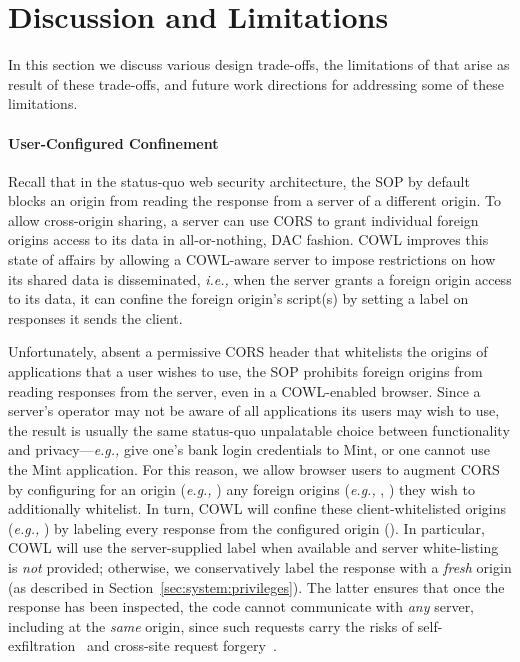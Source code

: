 \section{Discussion and Limitations}
\label{sec:discussion}

In this section we discuss various design trade-offs, the limitations
of \sys{} that arise as result of these trade-offs, and future work
directions for addressing some of these limitations.

\paragraph{User-Configured Confinement}
Recall that in the status-quo web security architecture, the SOP by
default blocks an origin from reading the response from a server of a
different origin. To allow cross-origin sharing, a server can use CORS
to grant individual foreign origins access to its data in
all-or-nothing, DAC fashion.
%
COWL improves this state of affairs
by allowing a COWL-aware server to impose restrictions on how its
shared data is disseminated, \emph{i.e.,} when the server
grants a foreign origin access to its data, it can confine the foreign
origin's script(s) by setting a label on responses it sends the
client.

Unfortunately, absent a permissive CORS header that whitelists the
origins of applications that a user wishes to use, the SOP
prohibits foreign origins from reading responses from the server,
even in a COWL-enabled browser.
%
Since a server's operator may not be aware of all applications its
users may wish to use, the result is usually the same status-quo
unpalatable choice between functionality and privacy---\emph{e.g.,} give
one's bank login credentials to Mint, or one cannot use the Mint
application.
%
For this reason, we allow browser users to augment CORS
by configuring for an origin (\emph{e.g.,} ) any foreign
origins (\emph{e.g.,} , ) they wish to
additionally whitelist.
%
In turn, COWL will confine these client-whitelisted origins (\emph{e.g.,}
) by labeling every response from the configured
origin ().
%
In particular, COWL will use the server-supplied label when available
and server white-listing is \emph{not} provided;
otherwise, we conservatively label the response with a
\emph{fresh} origin (as described in
Section~\ref{sec:system:privileges}). The latter ensures that once the
response has been inspected, the code cannot communicate with
\emph{any} server, including at the \emph{same} origin, since such
requests carry the risks of self-exfiltration~\cite{selfex} and
cross-site request forgery~\cite{CSRF}.
%


